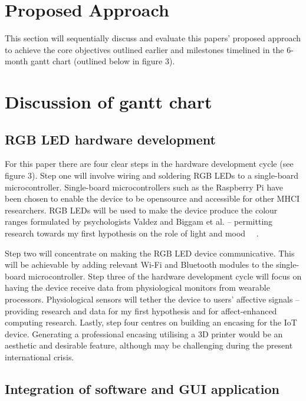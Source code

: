 \documentclass{sigchi}
\begin{document}
\section{Proposed Approach}

This section will sequentially discuss and evaluate this papers’ proposed approach to achieve the core objectives outlined earlier and milestones timelined in the 6-month gantt chart (outlined below in figure 3).

\section{Discussion of gantt chart}
\subsection{RGB LED hardware development}

For this paper there are four clear steps in the hardware development cycle (see figure 3). Step one will involve wiring and soldering RGB LEDs to a single-board microcontroller. Single-board microcontrollers such as the Raspberry Pi have been chosen to enable the device to be opensource and accessible for other MHCI researchers. RGB LEDs will be used to make the device produce the colour ranges formulated by psychologists Valdez and Biggam et al. – permitting research towards my first hypothesis on the role of light and mood ~\cite{biggam2006progress}~\cite{valdez1994effects}.

Step two will concentrate on making the RGB LED device communicative. This will be achievable by adding relevant Wi-Fi and Bluetooth modules to the single-board microcontroller. Step three of the hardware development cycle will focus on having the device receive data from physiological monitors from wearable processors. Physiological sensors will tether the device to users’ affective signals – providing research and data for my first hypothesis and for affect-enhanced computing research. Lastly, step four centres on building an encasing for the IoT device. Generating a professional encasing utilising a 3D printer would be an aesthetic and desirable feature, although may be challenging during the present international crisis.

\subsection{Integration of software and GUI application}
\end{document}
